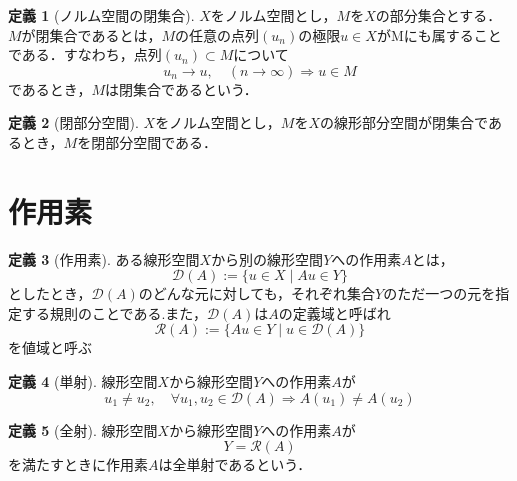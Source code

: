 \documentclass[11pt,a4paper,titlepage]{jsreport}
\theoremstyle{definition}
\newtheorem{dfn}{定義}
\begin{document}
\begin{dfn}[ノルム空間の閉集合]
  $X$をノルム空間とし，$M$を$X$の部分集合とする．$M$が閉集合であるとは，$M$の任意の点列$(u_n)$の極限$u\in X$がMにも属することである．すなわち，点列$(u_n)\subset M$について
  \begin{equation*}
    u_n\rightarrow u, \quad \left(n\rightarrow \infty\right) \Rightarrow u\in M
  \end{equation*}
  であるとき，$M$は閉集合であるという．
\end{dfn}

\begin{dfn}[閉部分空間]
  $X$をノルム空間とし，$M$を$X$の線形部分空間が閉集合であるとき，$M$を閉部分空間である．
\end{dfn}

\section{作用素}
\begin{dfn}[作用素]
  ある線形空間$X$から別の線形空間$Y$への作用素$A$とは，
  \begin{equation*}
    \mathcal{D}(A) := \{u \in X \mid Au \in Y\}
  \end{equation*}
  としたとき，$\mathcal{D}(A)$のどんな元に対しても，それぞれ集合$Y$のただ一つの元を指定する規則のことである.また，$\mathcal{D}(A)$は$A$の定義域と呼ばれ
  \begin{equation*}
    \mathcal{R}(A) := \{Au \in Y \mid u\in\mathcal{D}(A)\}
  \end{equation*}
  を値域と呼ぶ
\end{dfn}

\begin{dfn}[単射]
  \label{dfn:単射}
  線形空間$X$から線形空間$Y$への作用素$A$が
  \begin{equation*}
    u_1 \neq u_2, \quad \forall u_1,u_2 \in \mathcal{D}(A) \Rightarrow A(u_1)\neq A(u_2)
  \end{equation*}
\end{dfn}

\begin{dfn}[全射]
  \label{dfn:全射}
  線形空間$X$から線形空間$Y$への作用素$A$が
  \begin{equation*}
    Y=\mathcal{R}(A)
  \end{equation*}
  を満たすときに作用素$A$は全単射であるという．
\end{dfn}
\end{document}
